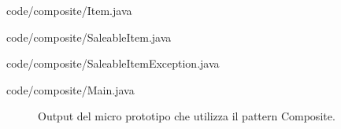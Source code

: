 \documentclass[12pt]{article}
\begin{document}

{code/composite/Item.java}


{code/composite/SaleableItem.java}


{code/composite/SaleableItemException.java}


{code/composite/Main.java}

\begin{figure}[!h]
  \caption{\small Output del micro prototipo che utilizza il pattern Composite.}
  \label{fig:client_composite}
\end{figure}


\newpage
\end{document}
